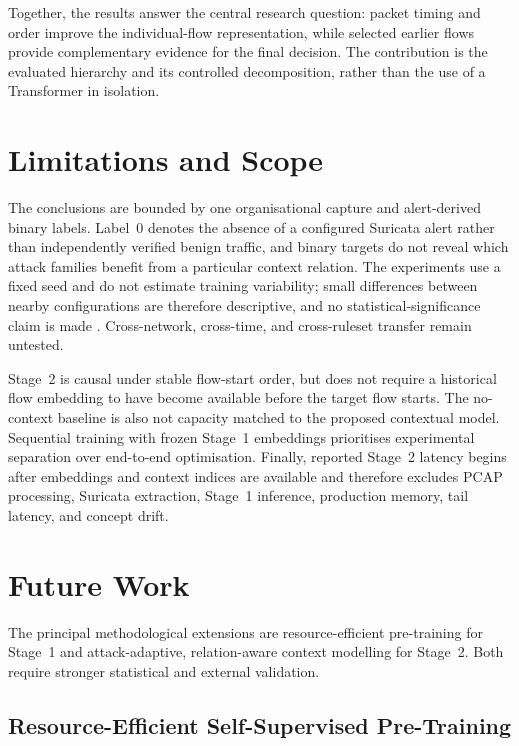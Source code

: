 \documentclass[11pt,fleqn]{report}
\begin{document}
Together, the results answer the central research question: packet timing and order improve the individual-flow representation, while selected earlier flows provide complementary evidence for the final decision. The contribution is the evaluated hierarchy and its controlled decomposition, rather than the use of a Transformer in isolation.

\section{Limitations and Scope}
\label{subsec:conclusion_limitations}

The conclusions are bounded by one organisational capture and alert-derived binary labels. Label~0 denotes the absence of a configured Suricata alert rather than independently verified benign traffic, and binary targets do not reveal which attack families benefit from a particular context relation. The experiments use a fixed seed and do not estimate training variability; small differences between nearby configurations are therefore descriptive, and no statistical-significance claim is made \cite{ReimersGurevych2017,Bouthillier2021Variance}. Cross-network, cross-time, and cross-ruleset transfer remain untested.

Stage~2 is causal under stable flow-start order, but does not require a historical flow embedding to have become available before the target flow starts. The no-context baseline is also not capacity matched to the proposed contextual model. Sequential training with frozen Stage~1 embeddings prioritises experimental separation over end-to-end optimisation. Finally, reported Stage~2 latency begins after embeddings and context indices are available and therefore excludes PCAP processing, Suricata extraction, Stage~1 inference, production memory, tail latency, and concept drift.

\section{Future Work}
\label{subsec:conclusion_future_work}

The principal methodological extensions are resource-efficient pre-training for Stage~1 and attack-adaptive, relation-aware context modelling for Stage~2. Both require stronger statistical and external validation.

\subsection{Resource-Efficient Self-Supervised Pre-Training}
\label{subsubsec:future_pretraining}
\end{document}
